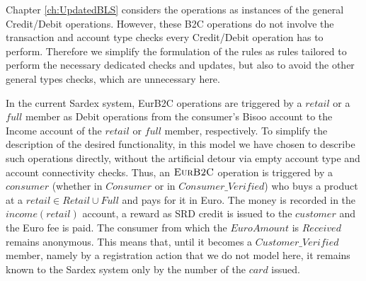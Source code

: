 Chapter \ref{ch:UpdatedBLS} considers the operations as instances of the general Credit/Debit operations. However, these B2C operations do not involve the transaction and account type checks every Credit/Debit operation has to perform. Therefore we simplify the formulation of the rules as rules tailored to perform the necessary dedicated checks and updates, but also to avoid the other general types checks, which are unnecessary here. 

In the current Sardex system, EurB2C operations are triggered by a $retail$ or a $full$ member as Debit operations from the consumer's Bisoo account to the Income account of the $retail$ or $full$ member, respectively. To simplify the description of the desired functionality, in this model we have chosen to describe such operations directly, without the artificial detour via empty account type and account connectivity checks. Thus, an $\hbox{\sc EurB2C}$ operation is triggered by a $consumer$ (whether in $Consumer$ or in $Consumer\_Verified$) who buys a product at a $retail \in Retail \cup Full$ and pays for it in Euro. The money is recorded in the $income(retail)$ account, a reward as SRD credit is issued to the $customer$ and the Euro fee is paid. The consumer from which the $EuroAmount$ is $Received$ remains anonymous. This means that, until it becomes a $Customer\_Verified$ member, namely by a registration action that we do not model here, it remains known to the Sardex system only by the number of the $card$ issued.

